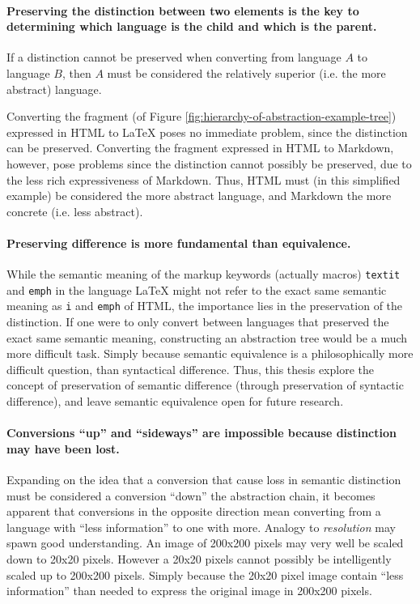 \documentclass{scrreprt}
\begin{document}
\paragraph{Preserving the distinction between two elements is the key to determining which language is the child and which is the parent.} If a distinction cannot be preserved when converting from language $A$ to language $B$, then $A$ must be considered the relatively superior (i.e. the more abstract) language.

Converting the fragment (of Figure \ref{fig:hierarchy-of-abstraction-example-tree}) expressed in HTML to \LaTeX{} poses no immediate problem, since the distinction can be preserved. Converting the fragment expressed in HTML to Markdown, however, pose problems since the distinction cannot possibly be preserved, due to the less rich expressiveness of Markdown. Thus, HTML must (in this simplified example) be considered the more abstract language, and Markdown the more concrete (i.e. less abstract).

\paragraph{Preserving difference is more fundamental than equivalence.} While the semantic meaning of the markup keywords (actually macros) \texttt{textit} and \texttt{emph} in the language \LaTeX{} might not refer to the exact same semantic meaning as \texttt{i} and \texttt{emph} of HTML, the importance lies in the preservation of the distinction. If one were to only convert between languages that preserved the exact same semantic meaning, constructing an abstraction tree would be a much more difficult task. Simply because semantic equivalence is a philosophically more difficult question, than syntactical difference. Thus, this thesis explore the concept of preservation of semantic difference (through preservation of syntactic difference), and leave semantic equivalence open for future research.


\paragraph{Conversions ``up'' and ``sideways'' are impossible because distinction may have been lost.} Expanding on the idea that a conversion that cause loss in semantic distinction must be considered a conversion ``down'' the abstraction chain, it becomes apparent that conversions in the opposite direction mean converting from a language with ``less information'' to one with more. Analogy to \emph{resolution} may spawn good understanding. An image of 200x200 pixels may very well be scaled down to 20x20 pixels. However a 20x20 pixels cannot possibly be intelligently scaled up to 200x200 pixels. Simply because the 20x20 pixel image contain ``less information'' than needed to express the original image in 200x200 pixels.
\end{document}
